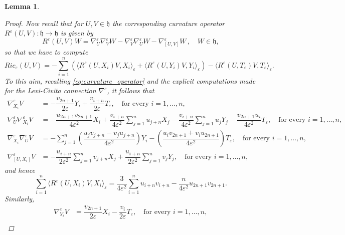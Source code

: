 \documentclass[10pt]{amsart}
\numberwithin{equation}{section}
\newtheorem{lemma}[theorem]{Lemma}
\theoremstyle{definition}
\begin{document}
\begin{lemma}
\begin{proof}
Now recall that for $U,V \in \mathfrak{h}$ the corresponding curvature operator $R^\varepsilon(U,V):\mathfrak{h} \to \mathfrak{h}$ is given by 
\begin{equation}\label{eq:curvature_operator} 
R^\varepsilon(U,V)W= \nabla^\varepsilon_U \nabla^\varepsilon_V W-\nabla^\varepsilon_V \nabla^\varepsilon_U W -\nabla^\varepsilon_{[U,V]} W \, , \quad W \in \mathfrak{h},
\end{equation}
so that we have to compute
\begin{equation*}
Ric_\varepsilon(U,V)=-\sum_{i=1}^{n}\left(\langle R^{\varepsilon}(U,X_i)V,X_i \rangle_{\varepsilon} + \langle R^{\varepsilon}(U,Y_i)V,Y_i \rangle_{\varepsilon}\right) - \langle R^{\varepsilon}(U,T_{\varepsilon})V,T_{\varepsilon}\rangle_{\varepsilon}.
\end{equation*}
To this aim, recalling \eqref{eq:curvature_operator} and the explicit computations made for the Levi-Civita connection $\nabla^{\varepsilon}$, it follows that
\begin{align*}
\nabla^{\varepsilon}_{X_i}V &= -\dfrac{v_{2n+1}}{2\varepsilon}Y_i + \dfrac{v_{i+n}}{2\varepsilon} T_{\varepsilon}, \quad \textrm{for every } i =1,\ldots,n,\\
\nabla^{\varepsilon}_{U}\nabla^{\varepsilon}_{X_i}V &= -\dfrac{u_{2n+1}v_{2n+1}}{4\varepsilon^2}X_i + \dfrac{v_{i+n}}{4\varepsilon^2}\sum_{j=1}^{n}u_{j+n}X_j - \dfrac{v_{i+n}}{4\varepsilon^2}\sum_{j=1}^{n}u_{j}Y_j - \dfrac{v_{2n+1}u_i}{4\varepsilon^2}T_{\varepsilon}, \quad \textrm{for every } i =1,\ldots,n,\\
\nabla^{\varepsilon}_{X_i}\nabla^{\varepsilon}_{U}V &=-\sum_{j=1}^{n}\left(\dfrac{u_j v_{j+n} - v_j u_{j+n}}{4\varepsilon^2}\right)Y_i - \left(\dfrac{u_i v_{2n+1}+v_i u_{2n+1}}{4\varepsilon^2}\right) T_{\varepsilon}, \quad \textrm{for every } i =1,\ldots,n,\\
\nabla^{\varepsilon}_{[U,X_i]}V &= -\dfrac{u_{i+n}}{2\varepsilon^2}\sum_{j=1}^{n}v_{j+n}X_j + \dfrac{u_{i+n}}{2\varepsilon^2}\sum_{j=1}^{n}v_{j}Y_j, \quad \textrm{for every } i =1,\ldots,n,
\end{align*}
\noindent and hence
\begin{equation}\label{eq:Ric_1}
\sum_{i=1}^{n} \langle R^{\varepsilon}(U,X_i)V,X_i \rangle_{\varepsilon} = \dfrac{3}{4\varepsilon^2}\sum_{i=1}^{n}u_{i+n}v_{i+n} - \dfrac{n}{4\varepsilon^2}u_{2n+1}v_{2n+1}.
\end{equation}
Similarly,
\begin{align*}
\nabla^{\varepsilon}_{Y_i}V &= \dfrac{v_{2n+1}}{2\varepsilon}X_i - \dfrac{v_{i}}{2\varepsilon} T_{\varepsilon}, \quad \textrm{for every } i =1,\ldots,n,\\

\end{align*}
\end{proof}
\end{lemma}
\end{document}
